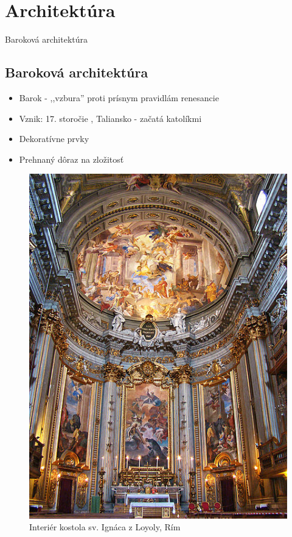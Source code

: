 \documentclass[dvipsnames]{beamer}
\begin{document}
\section{Architektúra}
\frame{\sectionpage}
\begin{frame}{Baroková architektúra}
	\subsection{Baroková architektúra}
	\begin{itemize}
		\item Barok - ,,vzbura'' proti prísnym pravidlám renesancie
		\item Vznik: 17. storočie , Taliansko - začatá katolíkmi
		\item Dekoratívne prvky
		\item Prehnaný dôraz na zložitosť
	\end{itemize}
		\begin{figure}
			\includegraphics[scale=0.3]{loyola}
			\caption{Interiér kostola sv. Ignáca z Loyoly, Rím}
		\end{figure}
\end{frame}
\end{document}
